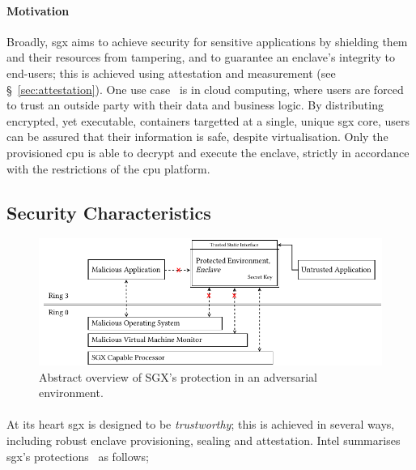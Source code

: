 \paragraph{Motivation} Broadly, \acrshort{sgx} aims to achieve security for sensitive applications by shielding them and their resources from tampering, and to guarantee an enclave's integrity to end-users; this is achieved using attestation and measurement (see §~\ref{sec:attestation}). One use case~\cite{10.1145/2834050.2834100, 10.1145/2799647, 10.1145/2810103.2813695} is in cloud computing, where users are forced to trust an outside party with their data and business logic. By distributing encrypted, yet executable, containers targetted at a single, unique \acrshort{sgx} core, users can be assured that their information is safe, despite virtualisation. Only the provisioned \acrshort{cpu} is able to decrypt and execute the enclave, strictly in accordance with the restrictions of the \acrshort{cpu} platform.

\subsection{Security Characteristics}

\begin{figure}[]
    \centering
    \includegraphics[width=0.95\linewidth]{figures/SGX-architecture.pdf}
    \caption{Abstract overview of SGX's protection in an adversarial environment.}
    \label{fig:sgx-basic}
\end{figure}

\paragraph{} At its heart \acrshort{sgx} is designed to be \textit{trustworthy}; this is achieved in several ways, including robust enclave provisioning, sealing and attestation. Intel summarises \acrshort{sgx}'s protections~\cite{10.1145/2487726.2488368,sgx-eval-sdk} as follows;

